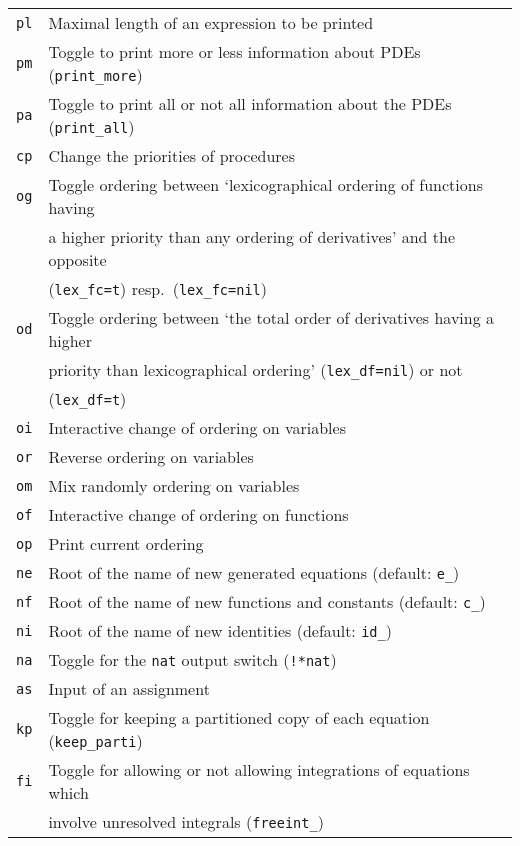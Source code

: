 \begin{longtable}[l]{ll}
  \texttt{pl} & Maximal length of an expression to be printed \\
  \texttt{pm} & Toggle to print more or less information about PDEs (\texttt{print\_more}) \\
  \texttt{pa} & Toggle to print all or not all information about the PDEs (\texttt{print\_all}) \\
  \texttt{cp} & Change the priorities of procedures \\
  \texttt{og} & Toggle ordering between `lexicographical ordering of functions having \\
  & a higher priority than any ordering of derivatives' and the opposite \\
  & (\texttt{lex\_fc=t}) resp.\ (\texttt{lex\_fc=nil}) \\
  \texttt{od} & Toggle ordering between `the total order of derivatives having a higher \\
  & priority than lexicographical ordering' (\texttt{lex\_df=nil}) or not \\
  & (\texttt{lex\_df=t}) \\
  \texttt{oi} & Interactive change of ordering on variables \\
  \texttt{or} & Reverse ordering on variables \\
  \texttt{om} & Mix randomly ordering on variables \\
  \texttt{of} & Interactive change of ordering on functions \\
  \texttt{op} & Print current ordering \\
  \texttt{ne} & Root of the name of new generated equations (default: \texttt{e\_}) \\
  \texttt{nf} & Root of the name of new functions and constants (default: \texttt{c\_}) \\
  \texttt{ni} & Root of the name of new identities (default: \texttt{id\_}) \\
  \texttt{na} & Toggle for the \texttt{nat} output switch (\texttt{!*nat}) \\
  \texttt{as} & Input of an assignment \\
  \texttt{kp} & Toggle for keeping a partitioned copy of each equation (\texttt{keep\_parti}) \\
  \texttt{fi} & Toggle for allowing or not allowing integrations of equations which \\
  & involve unresolved integrals (\texttt{freeint\_}) \\

\end{longtable}
